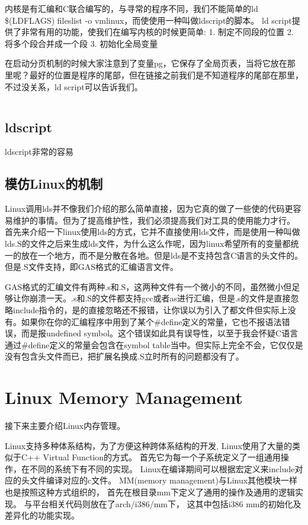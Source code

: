 内核是有汇编和C联合编写的，与寻常的程序不同，我们不能简单的ld \$(LDFLAGS) fileslist -o vmlinux，而使使用一种叫做ldscript的脚本。 ld script提供了非常有用的功能，使我们在编写内核的时候更简单:
1. 制定不同段的位置
2. 将多个段合并成一个段
3. 初始化全局变量

在启动分页机制的时候大家注意到了变量pg，它保存了全局页表，当将它放在那里呢？最好的位置是程序的尾部，但在链接之前我们是不知道程序的尾部在那里，不过没关系，ld script可以告诉我们。
\begin{lstlisting}[language=bash]


\end{lstlisting}


\subsection{ldscript}
ldscript非常的容易

\subsection{模仿Linux的机制}
Linux调用lds并不像我们介绍的那么简单直接，因为它真的做了一些使的代码更容易维护的事情。但为了提高维护性，我们必须提高我们对工具的使用能力才行。
首先来介绍一下linux使用lds的方式，它并不直接使用lds文件，而是使用一种叫做lds.S的文件之后来生成lds文件，为什么这么作呢，因为linux希望所有的变量都统一的放在一个地方，而不是分散在各地。但是lds是不支持包含C语言的头文件的。但是.S文件支持，即GAS格式的汇编语言文件。

GAS格式的汇编文件有两种.s和.S，这两种文件有一个微小的不同，虽然微小但足够让你崩溃一天。.s和.S的文件都支持gcc或者as进行汇编，但是.s的文件是直接忽略include指令的，是的直接忽略还不报错，让你误以为引入了都文件但实际上没有。如果你在你的汇编程序中用到了某个\#define定义的常量，它也不报语法错误，而是报undefined symbol。这个错误如此具有误导性，以至于我会怀疑C语言通过\#define定义的常量会包含在symbol table当中。但实际上完全不会，它仅仅是没有包含头文件而已，把扩展名换成.S立时所有的问题都没有了。


\section{Linux Memory Management}
接下来主要介绍Linux内存管理。

Linux支持多种体系结构，为了方便这种跨体系结构的开发, Linux使用了大量的类似于C++ Virtual Function的方式。
首先它为每一个子系统定义了一组通用操作，在不同的系统下有不同的实现。
Linux在编译期间可以根据宏定义来include对应的头文件编译对应的c文件。
MM(memory management)与Linux其他模块一样也是按照这种方式组织的， 首先在根目录mm下定义了通用的操作及通用的逻辑实现。
与平台相关代码则放在了arch/i386/mm下， 这其中包括i386 mm的初始化及差异化的功能实现。

